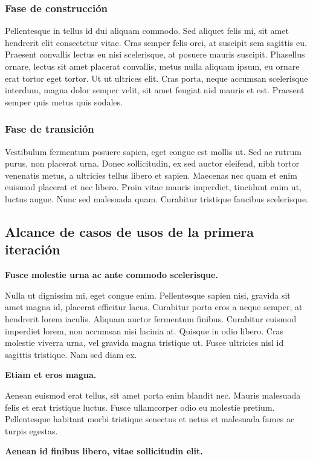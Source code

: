 \documentclass[a4paper, 10pt, twoside]{article}
\begin{document}
\subsubsection{Fase de construcción}
Pellentesque in tellus id dui aliquam commodo. Sed aliquet felis mi, sit amet hendrerit elit consectetur vitae. Cras semper felis orci, at suscipit sem sagittis eu. Praesent convallis lectus eu nisi scelerisque, at posuere mauris suscipit. Phasellus ornare, lectus sit amet placerat convallis, metus nulla aliquam ipsum, eu ornare erat tortor eget tortor. Ut ut ultrices elit. Cras porta, neque accumsan scelerisque interdum, magna dolor semper velit, sit amet feugiat nisl mauris et est. Praesent semper quis metus quis sodales.

\subsubsection{Fase de transición}
Vestibulum fermentum posuere sapien, eget congue est mollis ut. Sed ac rutrum purus, non placerat urna. Donec sollicitudin, ex sed auctor eleifend, nibh tortor venenatis metus, a ultricies tellus libero et sapien. Maecenas nec quam et enim euismod placerat et nec libero. Proin vitae mauris imperdiet, tincidunt enim ut, luctus augue. Nunc sed malesuada quam. Curabitur tristique faucibus scelerisque.

\subsection{Alcance de casos de usos de la primera iteración}
\textbf{Fusce molestie urna ac ante commodo scelerisque.}

Nulla ut dignissim mi, eget congue enim. Pellentesque sapien nisi, gravida sit amet magna id, placerat efficitur lacus. Curabitur porta eros a neque semper, at hendrerit lorem iaculis. Aliquam auctor fermentum finibus. Curabitur euismod imperdiet lorem, non accumsan nisi lacinia at. Quisque in odio libero. Cras molestie viverra urna, vel gravida magna tristique ut. Fusce ultricies nisl id sagittis tristique. Nam sed diam ex.

\textbf{Etiam et eros magna.}

Aenean euismod erat tellus, sit amet porta enim blandit nec. Mauris malesuada felis et erat tristique luctus. Fusce ullamcorper odio eu molestie pretium. Pellentesque habitant morbi tristique senectus et netus et malesuada fames ac turpis egestas.


\textbf{Aenean id finibus libero, vitae sollicitudin elit.}
\end{document}
